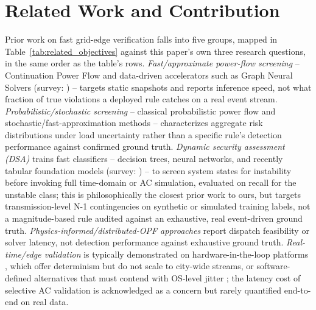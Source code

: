 \documentclass[11pt,conference]{IEEEtran}
\begin{document}
\section{Related Work and Contribution}
\label{sec:related}
Prior work on fast grid-edge verification falls into five groups, mapped in
Table~\ref{tab:related_objectives} against this paper's own three research questions, in the same
order as the table's rows.
\textit{Fast/approximate power-flow screening} -- Continuation Power Flow \cite{ref:Ajjarapu2007,
ref:wang2024extendedcpf} and data-driven accelerators such as Graph Neural Solvers
\cite{ref:Donon2020, ref:liu2023topology} (survey: \cite{ref:liao2022review}) -- targets static
snapshots and reports inference speed, not what fraction of true violations a deployed rule catches
on a real event stream. \textit{Probabilistic/stochastic screening} -- classical probabilistic
power flow \cite{ref:Hasanien2024} and stochastic/fast-approximation methods \cite{ref:Milano2013,
ref:Verdejo2019, ref:Yang2020} -- characterizes aggregate risk distributions under load uncertainty
rather than a specific rule's detection performance against confirmed ground truth.
\textit{Dynamic security assessment (DSA)} trains fast classifiers -- decision trees, neural
networks, and recently tabular foundation models \cite{ref:arowolo2026} (survey:
\cite{ref:cuevas2024}) -- to screen system states for instability before invoking full time-domain
or AC simulation, evaluated on recall for the unstable class; this is philosophically the closest
prior work to ours, but targets transmission-level N-1 contingencies on synthetic or simulated
training labels, not a magnitude-based rule audited against an exhaustive, real event-driven
ground truth. \textit{Physics-informed/distributed-OPF approaches} \cite{ref:Kim2026,
ref:Yang2023, ref:Magnusson2015, ref:Oh2021} report dispatch feasibility or solver latency, not
detection performance against exhaustive ground truth. \textit{Real-time/edge validation} is
typically demonstrated on hardware-in-the-loop platforms \cite{ref:Sidwall2022, ref:Guo2024}, which
offer determinism but do not scale to city-wide streams, or software-defined alternatives
\cite{ref:Mirz2019} that must contend with OS-level jitter \cite{ref:Madden2019}; the latency cost
of selective AC validation is acknowledged as a concern but rarely quantified end-to-end on real
data.
\end{document}
